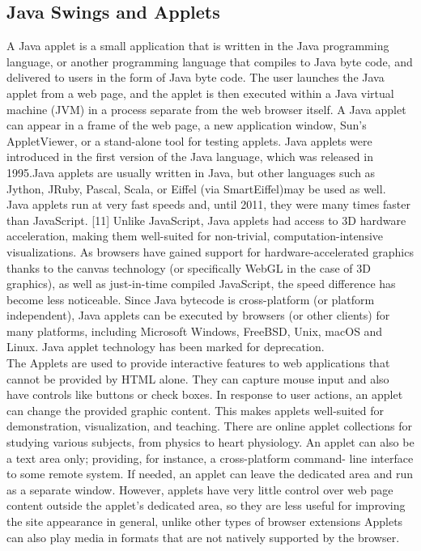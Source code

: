\subsection{Java Swings and Applets}
A Java applet is a small application that is written in the Java programming
language, or another programming language that compiles to Java byte code, and delivered to
users in the form of Java byte code. The user launches the Java applet from a web page, and
the applet is then executed within a Java virtual machine (JVM) in a process separate from
the web browser itself. A Java applet can appear in a frame of the web page, a new
application window, Sun's AppletViewer, or a stand-alone tool for testing applets. Java
applets were introduced in the first version of the Java language, which was released in
1995.Java applets are usually written in Java, but other languages such as Jython, JRuby,
Pascal, Scala, or Eiffel (via SmartEiffel)may be used as well.\\
Java applets run at very fast speeds and, until 2011, they were many times faster than
JavaScript. [11] Unlike JavaScript, Java applets had access to 3D hardware acceleration,
making them well-suited for non-trivial, computation-intensive visualizations. As browsers
have gained support for hardware-accelerated graphics thanks to the canvas technology (or
specifically WebGL in the case of 3D graphics), as well as just-in-time compiled JavaScript,
the speed difference has become less noticeable. Since Java bytecode is cross-platform (or
platform independent), Java applets can be executed by browsers (or other clients) for many
platforms, including Microsoft Windows, FreeBSD, Unix, macOS and Linux. Java applet
technology has been marked for deprecation.\\
The Applets are used to provide interactive features to web applications that cannot be
provided by HTML alone. They can capture mouse input and also have controls like buttons
or check boxes. In response to user actions, an applet can change the provided graphic
content. This makes applets well-suited for demonstration, visualization, and teaching. There
are online applet collections for studying various subjects, from physics to heart physiology.
An applet can also be a text area only; providing, for instance, a cross-platform command-
line interface to some remote system. If needed, an applet can leave the dedicated area and
run as a separate window. However, applets have very little control over web page content
outside the applet's dedicated area, so they are less useful for improving the site appearance in general, unlike other types of browser extensions Applets can also play media in formats that are not natively supported by the browser.\\

\thispagestyle{fancy}
